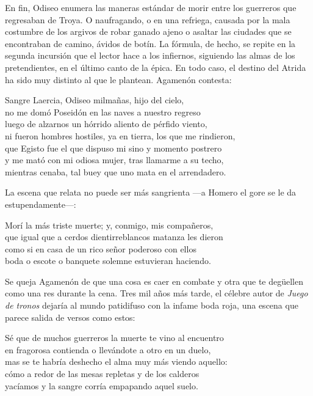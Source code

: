 En fin, Odiseo enumera las maneras estándar de morir entre los guerreros que regresaban de Troya. O naufragando, o en una refriega, causada por la mala costumbre de los argivos de robar ganado ajeno o asaltar las ciudades que se encontraban de camino, ávidos de botín. La fórmula, de hecho, se repite en la segunda incursión que el lector hace a los infiernos, siguiendo las almas de los pretendientes, en el último canto de la épica. En todo caso, el destino del Atrida ha sido muy distinto al que le plantean. Agamenón contesta:

\begin{versocita}
Sangre Laercia, Odiseo milmañas, hijo del cielo,\\
no me domó Poseidón en las naves a nuestro regreso\\
luego de alzarnos un hórrido aliento de pérfido viento,\\
ni fueron hombres hostiles, ya en tierra, los que me rindieron,\\
que Egisto fue el que dispuso mi sino y momento postrero\\
y me mató con mi odiosa mujer, tras llamarme a su techo,\\
mientras cenaba, tal buey que uno mata en el arrendadero.
\end{versocita}

La escena que relata no puede ser más sangrienta ---a Homero el gore se le da estupendamente---:

\begin{versocita}
Morí la más triste muerte; y, conmigo, mis compañeros,\\
que igual que a cerdos dientirreblancos matanza les dieron\\
como si en casa de un rico señor poderoso con ellos\\
boda o escote o banquete solemne estuvieran haciendo.
\end{versocita}

Se queja Agamenón de que una cosa es caer en combate y otra que te degüellen como una res durante la cena. Tres mil años más tarde, el célebre autor de \emph{Juego de tronos} dejaría al mundo patidifuso con la infame boda roja, una escena que parece salida de versos como estos:

\begin{versocita}
Sé que de muchos guerreros la muerte te vino al encuentro\\
en fragorosa contienda o llevándote a otro en un duelo,\\
mas se te habría deshecho el alma muy más viendo aquello:\\
cómo a redor de las mesas repletas y de los calderos\\
yacíamos y la sangre corría empapando aquel suelo.
\end{versocita}

